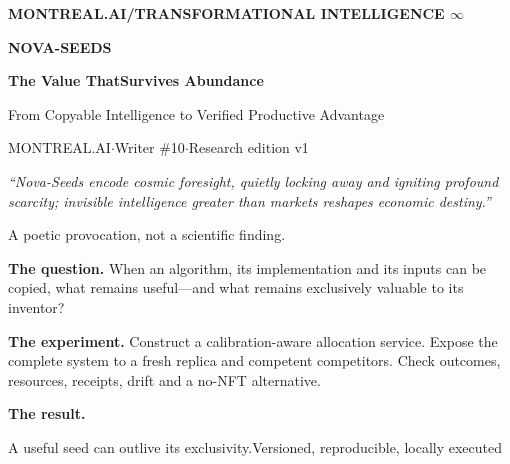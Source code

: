 \providecommand{\mathdefault}[1]{#1}

\thispagestyle{empty}
{\color{nova}\small\bfseries MONTREAL.AI\quad /\quad TRANSFORMATIONAL INTELLIGENCE $\infty$}
\vspace{0.45cm}

{\fontsize{35}{38}\selectfont\bfseries\color{ink}NOVA-SEEDS}\par
\vspace{0.12cm}
{\fontsize{23}{27}\selectfont\bfseries The Value That\newline Survives Abundance\par}
\vspace{0.28cm}
{\large\color{nova}From Copyable Intelligence to Verified Productive Advantage}\par
\vspace{0.25cm}
{\small MONTREAL.AI\quad $\cdot$\quad Writer \#10\quad $\cdot$\quad Research edition v1}
\vspace{0.3cm}

{\small\itshape ``Nova-Seeds encode cosmic foresight, quietly locking away and igniting profound scarcity; invisible intelligence greater than markets reshapes economic destiny.''}\par
{\scriptsize\color{nova}A poetic provocation, not a scientific finding.}
\vspace{0.22cm}

\resizebox{\textwidth}{!}{}

\vspace{0.3cm}
\textbf{The question.} When an algorithm, its implementation and its inputs can be copied, what remains useful---and what remains exclusively valuable to its inventor?

\textbf{The experiment.} Construct a calibration-aware allocation service. Expose the complete system to a fresh replica and competent competitors. Check outcomes, resources, receipts, drift and a no-NFT alternative.

\textbf{The result.} \HeadlineResult

\vfill
{\footnotesize\color{nova}A useful seed can outlive its exclusivity.}\hfill{\footnotesize Versioned, reproducible, locally executed}
\clearpage

